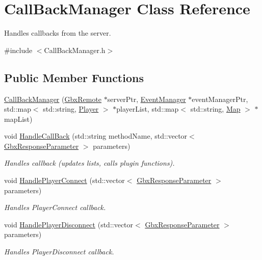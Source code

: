 \hypertarget{classCallBackManager}{\section{Call\-Back\-Manager Class Reference}
\label{classCallBackManager}
}


Handles callbacks from the server.  




{\ttfamily \#include $<$Call\-Back\-Manager.\-h$>$}

\subsection*{Public Member Functions}
\begin{DoxyCompactItemize}
\item 
\hyperlink{classCallBackManager_aaba219c50eef1526a771f1606cf24396}{Call\-Back\-Manager} (\hyperlink{classGbxRemote}{Gbx\-Remote} $\ast$server\-Ptr, \hyperlink{classEventManager}{Event\-Manager} $\ast$event\-Manager\-Ptr, std\-::map$<$ std\-::string, \hyperlink{structPlayer}{Player} $>$ $\ast$player\-List, std\-::map$<$ std\-::string, \hyperlink{structMap}{Map} $>$ $\ast$map\-List)
\item 
void \hyperlink{classCallBackManager_a8af5305f668aae4c563e7039b99015c2}{Handle\-Call\-Back} (std\-::string method\-Name, std\-::vector$<$ \hyperlink{classGbxResponseParameter}{Gbx\-Response\-Parameter} $>$ parameters)
\begin{DoxyCompactList}\small\item\em Handles callback (updates lists, calls plugin functions). \end{DoxyCompactList}\item 
void \hyperlink{classCallBackManager_a48e888c80841cf757ebdd69726a8aed5}{Handle\-Player\-Connect} (std\-::vector$<$ \hyperlink{classGbxResponseParameter}{Gbx\-Response\-Parameter} $>$ parameters)
\begin{DoxyCompactList}\small\item\em Handles Player\-Connect callback. \end{DoxyCompactList}\item 
void \hyperlink{classCallBackManager_aa762cbece4e59d8395f5dbd857c53f17}{Handle\-Player\-Disconnect} (std\-::vector$<$ \hyperlink{classGbxResponseParameter}{Gbx\-Response\-Parameter} $>$ parameters)
\begin{DoxyCompactList}\small\item\em Handles Player\-Disconnect callback. \end{DoxyCompactList}\item 

\end{DoxyCompactItemize}
